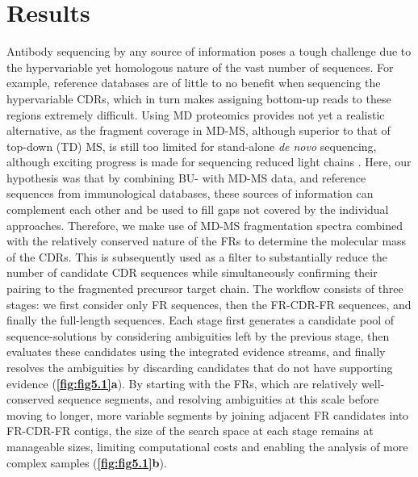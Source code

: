 \section{Results}
Antibody sequencing by any source of information poses a tough challenge due to the hypervariable yet homologous nature of the vast number of sequences. For example, reference databases are of little to no benefit when sequencing the hypervariable CDRs, which in turn makes assigning bottom-up reads to these regions extremely difficult. Using MD proteomics provides not yet a realistic alternative, as the fragment coverage in MD-MS, although superior to that of top-down (TD) MS, is still too limited for stand-alone \emph{de novo} sequencing, although exciting progress is made for sequencing reduced light chains \cite{dupré2021de, melani2019direct}. Here, our hypothesis was that by combining BU- with MD-MS data, and reference sequences from immunological databases, these sources of information can complement each other and be used to fill gaps not covered by the individual approaches. Therefore, we make use of MD-MS fragmentation spectra combined with the relatively conserved nature of the FRs to determine the molecular mass of the CDRs. This is subsequently used as a filter to substantially reduce the number of candidate CDR sequences while simultaneously confirming their pairing to the fragmented precursor target chain.
The workflow consists of three stages: we first consider only FR sequences, then the FR-CDR-FR sequences, and finally the full-length sequences. Each stage first generates a candidate pool of sequence-solutions by considering ambiguities left by the previous stage, then evaluates these candidates using the integrated evidence streams, and finally resolves the ambiguities by discarding candidates that do not have supporting evidence (\textbf{\autoref{fig:fig5.1}a}). By starting with the FRs, which are relatively well-conserved sequence segments, and resolving ambiguities at this scale before moving to longer, more variable segments by joining adjacent FR candidates into FR-CDR-FR contigs, the size of the search space at each stage remains at manageable sizes, limiting computational costs and enabling the analysis of more complex samples (\textbf{\autoref{fig:fig5.1}b}).
